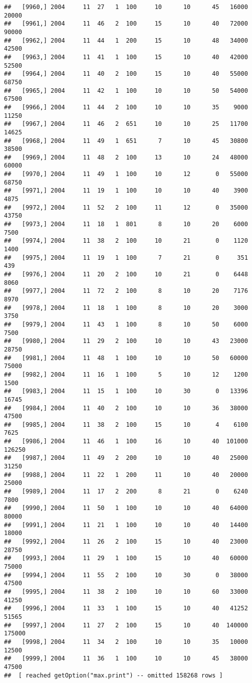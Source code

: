 \documentclass{article}\usepackage[]{graphicx}\usepackage[]{color}
\makeatletter
\newenvironment{kframe}{%
 \def\at@end@of@kframe{}%
 \ifinner\ifhmode%
  \def\at@end@of@kframe{\end{minipage}}%
  \begin{minipage}{\columnwidth}%
 \fi\fi%
 \def\FrameCommand##1{\hskip\@totalleftmargin \hskip-\fboxsep
 \colorbox{shadecolor}{##1}\hskip-\fboxsep
     \hskip-\linewidth \hskip-\@totalleftmargin \hskip\columnwidth}%
 \MakeFramed {\advance\hsize-\width
   \@totalleftmargin\z@ \linewidth\hsize
   \@setminipage}}%
 {\par\unskip\endMakeFramed%
 \at@end@of@kframe}
\newenvironment{knitrout}{}{} %
\makeatother
\begin{document}
\begin{knitrout}
\begin{kframe}
\begin{verbatim}
##   [9960,] 2004     11  27   1  100     10      10      45   16000   20000
##   [9961,] 2004     11  46   2  100     15      10      40   72000   90000
##   [9962,] 2004     11  44   1  200     15      10      48   34000   42500
##   [9963,] 2004     11  41   1  100     15      10      40   42000   52500
##   [9964,] 2004     11  40   2  100     15      10      40   55000   68750
##   [9965,] 2004     11  42   1  100     10      10      50   54000   67500
##   [9966,] 2004     11  44   2  100     10      10      35    9000   11250
##   [9967,] 2004     11  46   2  651     10      10      25   11700   14625
##   [9968,] 2004     11  49   1  651      7      10      45   30800   38500
##   [9969,] 2004     11  48   2  100     13      10      24   48000   60000
##   [9970,] 2004     11  49   1  100     10      12       0   55000   68750
##   [9971,] 2004     11  19   1  100     10      10      40    3900    4875
##   [9972,] 2004     11  52   2  100     11      12       0   35000   43750
##   [9973,] 2004     11  18   1  801      8      10      20    6000    7500
##   [9974,] 2004     11  38   2  100     10      21       0    1120    1400
##   [9975,] 2004     11  19   1  100      7      21       0     351     439
##   [9976,] 2004     11  20   2  100     10      21       0    6448    8060
##   [9977,] 2004     11  72   2  100      8      10      20    7176    8970
##   [9978,] 2004     11  18   1  100      8      10      20    3000    3750
##   [9979,] 2004     11  43   1  100      8      10      50    6000    7500
##   [9980,] 2004     11  29   2  100     10      10      43   23000   28750
##   [9981,] 2004     11  48   1  100     10      10      50   60000   75000
##   [9982,] 2004     11  16   1  100      5      10      12    1200    1500
##   [9983,] 2004     11  15   1  100     10      30       0   13396   16745
##   [9984,] 2004     11  40   2  100     10      10      36   38000   47500
##   [9985,] 2004     11  38   2  100     15      10       4    6100    7625
##   [9986,] 2004     11  46   1  100     16      10      40  101000  126250
##   [9987,] 2004     11  49   2  200     10      10      40   25000   31250
##   [9988,] 2004     11  22   1  200     11      10      40   20000   25000
##   [9989,] 2004     11  17   2  200      8      21       0    6240    7800
##   [9990,] 2004     11  50   1  100     10      10      40   64000   80000
##   [9991,] 2004     11  21   1  100     10      10      40   14400   18000
##   [9992,] 2004     11  26   2  100     15      10      40   23000   28750
##   [9993,] 2004     11  29   1  100     15      10      40   60000   75000
##   [9994,] 2004     11  55   2  100     10      30       0   38000   47500
##   [9995,] 2004     11  38   2  100     10      10      60   33000   41250
##   [9996,] 2004     11  33   1  100     15      10      40   41252   51565
##   [9997,] 2004     11  27   2  100     15      10      40  140000  175000
##   [9998,] 2004     11  34   2  100     10      10      35   10000   12500
##   [9999,] 2004     11  36   1  100     10      10      45   38000   47500
##  [ reached getOption("max.print") -- omitted 158268 rows ]
\end{verbatim}
\end{kframe}
\end{knitrout}
\end{document}
